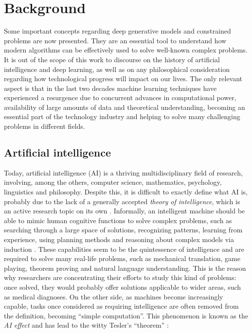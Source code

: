 \chapter{Background}
\label{ch:background}

Some important concepts regarding deep generative models and constrained problems are now presented. They are an essential tool to understand how modern algorithms can be effectively used to solve well-known complex problems. It is out of the scope of this work to discourse on the history of artificial intelligence and deep learning, as well as on any philosophical consideration regarding how technological progress will impact on our lives. The only relevant aspect is that in the last two decades machine learning techniques have experienced a resurgence due to concurrent advances in computational power, availability of large amounts of data and theoretical understanding, becoming an essential part of the technology industry and helping to solve many challenging problems in different fields.

\section{Artificial intelligence}

Today, artificial intelligence (AI) is a thriving multidisciplinary field of research, involving, among the others, computer science, mathematics, psychology, linguistics and philosophy. Despite this, it is difficult to exactly define what AI is, probably due to the lack of a generally accepted \textit{theory of intelligence}, which is an active research topic on its own \cite{machine_intelligence}. Informally, an intelligent machine should be able to mimic human cognitive functions to solve complex problems, such as searching through a large space of solutions, recognizing patterns, learning from experience, using planning methods and reasoning about complex models via induction \cite{steps_towards_AI}. These capabilities seem to be the quintessence of intelligence and are required to solve many real-life problems, such as mechanical translation, game playing, theorem proving and natural language understanding. This is the reason why researchers are concentrating their efforts to study this kind of problems: once solved, they would probably offer solutions applicable to wider areas, such as medical diagnoses. On the other side, as machines become increasingly capable, tasks once considered as requiring intelligence are often removed from the definition, becoming ``simple computation''. This phenomenon is known as the \textit{AI effect} and has lead to the witty Tesler's ``theorem'' \cite{golden_braid}:


